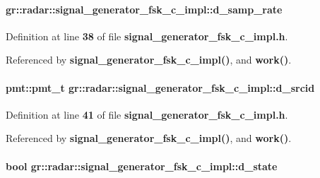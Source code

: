 \paragraph[{d\+\_\+samp\+\_\+rate}]{ gr\+::radar\+::signal\+\_\+generator\+\_\+fsk\+\_\+c\+\_\+impl\+::d\+\_\+samp\+\_\+rate}\label{classgr_1_1radar_1_1signal__generator__fsk__c__impl_a33c2fc01ddc56113be0a4acdbcb39afc}


Definition at line {\bf 38} of file {\bf signal\+\_\+generator\+\_\+fsk\+\_\+c\+\_\+impl.\+h}.



Referenced by {\bf signal\+\_\+generator\+\_\+fsk\+\_\+c\+\_\+impl()}, and {\bf work()}.

\paragraph[{d\+\_\+srcid}]{\setlength{\rightskip}{0pt plus 5cm}pmt\+::pmt\+\_\+t gr\+::radar\+::signal\+\_\+generator\+\_\+fsk\+\_\+c\+\_\+impl\+::d\+\_\+srcid}\label{classgr_1_1radar_1_1signal__generator__fsk__c__impl_a21550da434d320d0ea4d063827376ed9}


Definition at line {\bf 41} of file {\bf signal\+\_\+generator\+\_\+fsk\+\_\+c\+\_\+impl.\+h}.



Referenced by {\bf signal\+\_\+generator\+\_\+fsk\+\_\+c\+\_\+impl()}, and {\bf work()}.

\paragraph[{d\+\_\+state}]{\setlength{\rightskip}{0pt plus 5cm}bool gr\+::radar\+::signal\+\_\+generator\+\_\+fsk\+\_\+c\+\_\+impl\+::d\+\_\+state}\label{classgr_1_1radar_1_1signal__generator__fsk__c__impl_a9c0d61f921382cd4ec6b17a4d68af24c}



